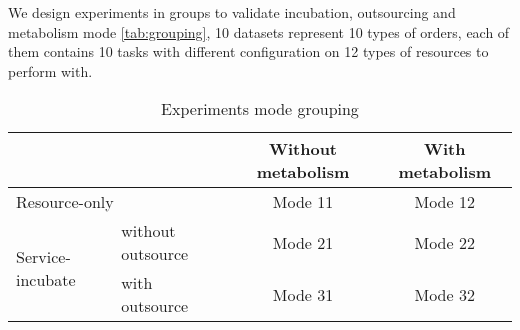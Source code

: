 We design experiments in groups to validate incubation, outsourcing and metabolism mode \autoref{tab:grouping}, 10 datasets represent 10 types of orders, each of them contains 10 tasks with different configuration on 12 types of resources to perform with. 

\begin{table}[htbp]
  \centering
  \scriptsize
  \caption{Experiments mode grouping}
    \begin{tabular}{llcc}
    \toprule
          &       & Without metabolism & With metabolism \\
    \midrule
    \multicolumn{2}{l}{Resource-only} & Mode 11 & Mode 12 \\\hline
    \multicolumn{1}{l}{\multirow{2}[0]{*}{Service-incubate}} & without outsource & Mode 21 &Mode 22 \\\cline{2-4}
    \multicolumn{1}{l}{} & with outsource & Mode 31 & Mode 32 \\
    \bottomrule
    \end{tabular}%
  \label{tab:grouping}%
\end{table}%

